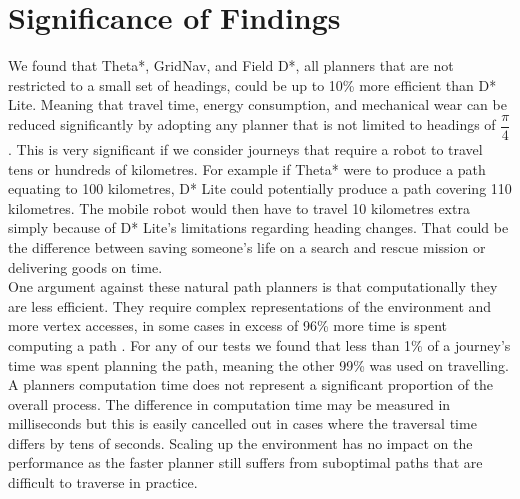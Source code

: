\newpage

\section{Significance of Findings}
We found that Theta*, GridNav, and Field D*, all planners that are not restricted to a small set of headings, could be up to 10\% more efficient than D* Lite. Meaning that travel time, energy consumption, and mechanical wear can be reduced significantly by adopting any planner that is not limited to headings of $\dfrac{\pi}{4}$. This is very significant if we consider journeys that require a robot to travel tens or hundreds of kilometres. For example if Theta* were to produce a path equating to 100 kilometres, D* Lite could potentially produce a path covering 110 kilometres. The mobile robot would then have to travel 10 kilometres extra simply because of D* Lite's limitations regarding heading changes. That could be the difference between saving someone's life on a search and rescue mission or delivering goods on time. \\

\noindent
One argument against these natural path planners is that computationally they are less efficient. They require complex representations of the environment and more vertex accesses, in some cases in excess of 96\% more time is spent computing a path \cite{FIELD}. For any of our tests we found that less than 1\% of a journey's time was spent planning the path, meaning the other 99\% was used on travelling. A planners computation time does not represent a significant proportion of the overall process. The difference in computation time may be measured in milliseconds but this is easily cancelled out in cases where the traversal time differs by tens of seconds. Scaling up the environment has no impact on the performance as the faster planner still suffers from suboptimal paths that are difficult to traverse in practice.